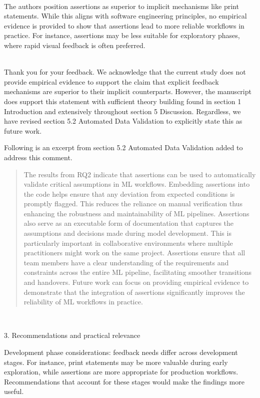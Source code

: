 \documentclass[11pt,fleqn]{article}
\newcommand{\eline}{\vspace*{.75\baselineskip}}
\newcommand{\Referee}[1]{\eline \noindent {\bf Reviewer comment #1:} \\}
\newcommand{\Us}{\eline \noindent {\bf Response:}\\}
\newenvironment{revcomment}[1][]
{\Referee{#1}\begin{rcomment}}
{\end{rcomment}}
\begin{document}
\begin{revcomment}[2.9]
  The authors position assertions as superior to implicit mechanisms like print statements. While this aligns with software engineering principles, no empirical evidence is provided to show that assertions lead to more reliable workflows in practice. For instance, assertions may be less suitable for exploratory phases, where rapid visual feedback is often preferred.
\end{revcomment}

\Us Thank you for your feedback. We acknowledge that the current study does not provide empirical evidence to support the claim that explicit feedback mechanisms are superior to their implicit counterparts. However, the manuscript does support this statement with sufficient theory building found in section 1 Introduction and extensively throughout section 5 Discussion. Regardless, we have revised section 5.2 Automated Data Validation to explicitly state this as future work.

Following is an excerpt from section 5.2 Automated Data Validation added to address this comment.

\begin{quote}
  The results from RQ2 indicate that assertions can be used to automatically validate critical assumptions in ML workflows. Embedding assertions into the code helps ensure that any deviation from expected conditions is promptly flagged. This reduces the reliance on manual verification thus enhancing the robustness and maintainability of ML pipelines. Assertions also serve as an executable form of documentation that captures the assumptions and decisions made during model development. This is particularly important in collaborative environments where multiple practitioners might work on the same project. Assertions ensure that all team members have a clear understanding of the requirements and constraints across the entire ML pipeline, facilitating smoother transitions and handovers. Future work can focus on providing empirical evidence to demonstrate that the integration of assertions significantly improves the reliability of ML workflows in practice.
\end{quote}

\begin{revcomment}[2.10]
  3. Recommendations and practical relevance

  Development phase considerations: feedback needs differ across development stages. For instance, print statements may be more valuable during early exploration, while assertions are more appropriate for production workflows. Recommendations that account for these stages would make the findings more useful.
\end{revcomment}
\end{document}
